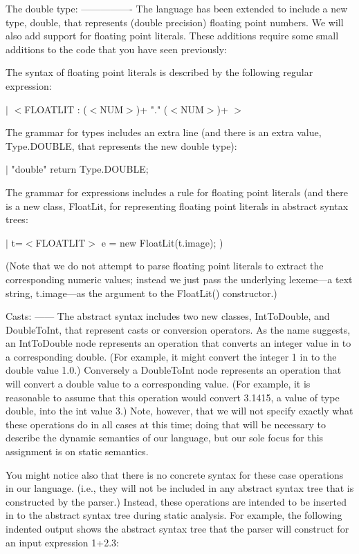\documentclass{article}
\begin{document}
The double type:
----------------
The language has been extended to include a new type, double, that
represents (double precision) floating point numbers.  We will also
add support for floating point literals.  These additions require some
small additions to the code that you have seen previously:

The syntax of floating point literals is described by the following
regular expression:

$|$  $<$FLOATLIT   : ($<$NUM$>$)+ "." ($<$NUM$>$)+ $>$

The grammar for types includes an extra line (and there is an extra
value, Type.DOUBLE, that represents the new double type):

$|$ "double"  { return Type.DOUBLE; }

The grammar for expressions includes a rule for floating point
literals (and there is a new class, FloatLit, for representing
floating point literals in abstract syntax trees:

$|$ t=$<$FLOATLIT$>$ { e = new FloatLit(t.image); })

(Note that we do not attempt to parse floating point literals to
extract the corresponding numeric values; instead we just pass the
underlying lexeme---a text string, t.image---as the argument to the
FloatLit() constructor.)

Casts:
------
The abstract syntax includes two new classes, IntToDouble, and
DoubleToInt, that represent casts or conversion operators.  As the
name suggests, an IntToDouble node represents an operation that
converts an integer value in to a corresponding double.  (For example,
it might convert the integer 1 in to the double value 1.0.)
Conversely a DoubleToInt node represents an operation that will
convert a double value to a corresponding value.  (For example, it is
reasonable to assume that this operation would convert 3.1415, a value
of type double, into the int value 3.) Note, however, that we will not
specify exactly what these operations do in all cases at this time;
doing that will be necessary to describe the dynamic semantics of our
language, but our sole focus for this assignment is on static
semantics.

You might notice also that there is no concrete syntax for these case
operations in our language.  (i.e., they will not be included in any
abstract syntax tree that is constructed by the parser.) Instead,
these operations are intended to be inserted in to the abstract syntax
tree during static analysis.  For example, the following indented
output shows the abstract syntax tree that the parser will construct
for an input expression 1+2.3:
\end{document}
